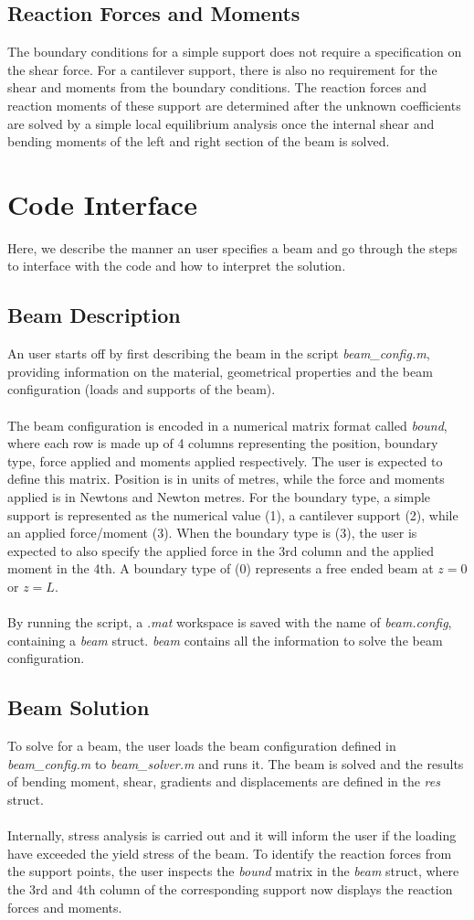 \documentclass[11pt,a4paper]{article}
\begin{document}
\subsection{Reaction Forces and Moments}
The boundary conditions for a simple support does not require a specification on the shear force. For a cantilever support, there is also no requirement for the shear and moments from the boundary conditions. The reaction forces and reaction moments of these support are determined after the unknown coefficients are solved by a simple local equilibrium analysis once the internal shear and bending moments of the left and right section of the beam is solved.
\section{Code Interface}
Here, we describe the manner an user specifies a beam and go through the steps to interface with the code and how to interpret the solution.
\subsection{Beam Description}
An user starts off by first describing the beam in the script \textit{beam\_config.m}, providing information on the material, geometrical properties and the beam configuration (loads and supports of the beam).\\
\\
The beam configuration is encoded in a numerical matrix format called \textit{bound}, where each row is made up of 4 columns representing the position, boundary type, force applied and moments applied respectively. The user is expected to define this matrix. Position is in units of metres, while the force and moments applied is in Newtons and Newton metres. For the boundary type, a simple support is represented as the numerical value (1), a cantilever support (2), while an applied force/moment (3). When the boundary type is (3), the user is expected to also specify the applied force in the 3rd column and the applied moment in the 4th. A boundary type of (0) represents a free ended beam at $z = 0$ or $z = L$.\\
\\
By running the script, a \textit{.mat} workspace is saved with the name of \textit{beam.config}, containing a \textit{beam} struct. \textit{beam} contains all the information to solve the beam configuration.
\subsection{Beam Solution}
To solve for a beam, the user loads the beam configuration defined in \textit{beam\_config.m} to \textit{beam\_solver.m} and runs it. The beam is solved and the results of bending moment, shear, gradients and displacements are defined in the \textit{res} struct.\\
\\
Internally, stress analysis is carried out and it will inform the user if the loading have exceeded the yield stress of the beam. To identify the reaction forces from the support points, the user inspects the \textit{bound} matrix in the \textit{beam} struct, where the 3rd and 4th column of the corresponding support now displays the reaction forces and moments.
\end{document}
